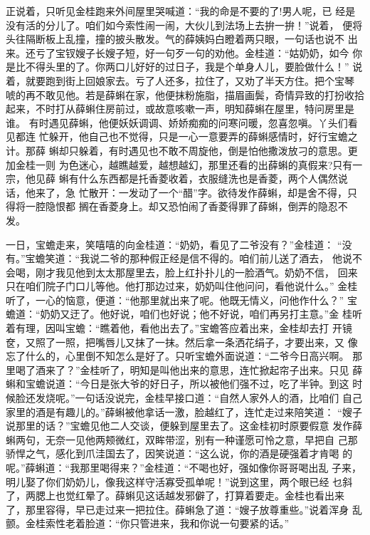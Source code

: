 正说着，只听见金桂跑来外间屋里哭喊道：“我的命是不要的了!男人呢，已
经是没有活的分儿了。咱们如今索性闹一闹，大伙儿到法场上去拚一拚！”说着，
便将头往隔断板上乱撞，撞的披头散发。气的薛姨妈白瞪着两只眼，一句话也说不
出来。还亏了宝钗嫂子长嫂子短，好一句歹一句的劝他。金桂道：“姑奶奶，如今
你是比不得头里的了。你两口儿好好的过日子，我是个单身人儿，要脸做什么！”
说着，就要跑到街上回娘家去。亏了人还多，拉住了，又劝了半天方住。把个宝琴
唬的再不敢见他。若是薛蝌在家，他便抹粉施脂，描眉画鬓，奇情异致的打扮收拾
起来，不时打从薛蝌住房前过，或故意咳嗽一声，明知薛蝌在屋里，特问房里是谁。
有时遇见薛蝌，他便妖妖调调、娇娇痴痴的问寒问暖，忽喜忽嗔。丫头们看见都连
忙躲开，他自己也不觉得，只是一心一意要弄的薛蝌感情时，好行宝蟾之计。那薛
蝌却只躲着，有时遇见也不敢不周旋他，倒是怕他撒泼放刁的意思。更加金桂一则
为色迷心，越瞧越爱，越想越幻，那里还看的出薛蝌的真假来?只有一宗，他见薛
蝌有什么东西都是托香菱收着，衣服缝洗也是香菱，两个人偶然说话，他来了，急
忙散开：一发动了一个“醋”字。欲待发作薛蝌，却是舍不得，只得将一腔隐恨都
搁在香菱身上。却又恐怕闹了香菱得罪了薛蝌，倒弄的隐忍不发。

一日，宝蟾走来，笑嘻嘻的向金桂道：“奶奶，看见了二爷没有？”金桂道：
“没有。”宝蟾笑道：“我说二爷的那种假正经是信不得的。咱们前儿送了酒去，
他说不会喝，刚才我见他到太太那屋里去，脸上红扑扑儿的一脸酒气。奶奶不信，
回来只在咱们院子门口儿等他。他打那边过来，奶奶叫住他问问，看他说什么。”
金桂听了，一心的恼意，便道：“他那里就出来了呢。他既无情义，问他作什么？”
宝蟾道：“奶奶又迂了。他好说，咱们也好说；他不好说，咱们再另打主意。”金
桂听着有理，因叫宝蟾：“瞧着他，看他出去了。”宝蟾答应着出来，金桂却去打
开镜奁，又照了一照，把嘴唇儿又抹了一抹。然后拿一条洒花绢子，才要出来，又
像忘了什么的，心里倒不知怎么是好了。只听宝蟾外面说道：“二爷今日高兴啊。
那里喝了酒来了？”金桂听了，明知是叫他出来的意思，连忙掀起帘子出来。只见
薛蝌和宝蟾说道：“今日是张大爷的好日子，所以被他们强不过，吃了半钟。到这
时候脸还发烧呢。”一句话没说完，金桂早接口道：“自然人家外人的酒，比咱们
自己家里的酒是有趣儿的。”薛蝌被他拿话一激，脸越红了，连忙走过来陪笑道：
“嫂子说那里的话？”宝蟾见他二人交谈，便躲到屋里去了。这金桂初时原要假意
发作薛蝌两句，无奈一见他两颊微红，双眸带涩，别有一种谨愿可怜之意，早把自
己那骄悍之气，感化到爪洼国去了，因笑说道：“这么说，你的酒是硬强着才肯喝
的呢。”薛蝌道：“我那里喝得来？”金桂道：“不喝也好，强如像你哥哥喝出乱
子来，明儿娶了你们奶奶儿，像我这样守活寡受孤单呢！”说到这里，两个眼已经
乜斜了，两腮上也觉红晕了。薛蝌见这话越发邪僻了，打算着要走。金桂也看出来
了，那里容得，早已走过来一把拉住。薛蝌急了道：“嫂子放尊重些。”说着浑身
乱颤。金桂索性老着脸道：“你只管进来，我和你说一句要紧的话。”

